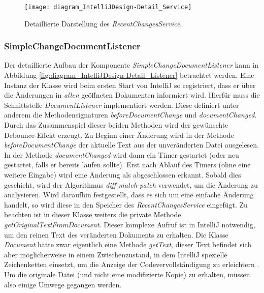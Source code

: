\begin{figure}
    \centering
    \texttt{[image: diagram\_IntelliJDesign-Detail\_Service]}
    \caption{Detaillierte Darstellung des \emph{RecentChangesService}.}
    \label{fig:diagram_IntelliJDesign-Detail_Service}
\end{figure}

\subsubsection{SimpleChangeDocumentListener}

Der detaillierte Aufbau der Komponente \emph{SimpleChangeDocumentListener}
kann in Abbildung \ref{fig:diagram_IntelliJDesign-Detail_Listener} betrachtet werden.
Eine Instanz der Klasse wird beim ersten Start von IntelliJ so registriert, 
dass er über die Änderungen in \emph{allen} geöffneten Dokumenten informiert wird. 
Hierfür muss die Schnittstelle \emph{DocumentListener} implementiert werden.
Diese definiert unter anderem die Methodensignaturen \emph{beforeDocumentChange}
und \emph{documentChanged}. Durch das Zusammenspiel dieser beiden Methoden
wird der gewünschte Debounce-Effekt erzeugt. Zu Beginn einer Änderung
wird in der Methode \emph{beforeDocumentChange} der aktuelle Text aus der 
unveränderten Datei ausgelesen. In der Methode \emph{documentChanged} wird
dann ein Timer gestartet (oder neu gestartet, falls er bereits laufen sollte).
Erst nach Ablauf des Timers (ohne eine weitere Eingabe) wird
eine Änderung als abgeschlossen erkannt. Sobald dies geschieht, wird 
der Algorithmus \emph{diff-match-patch} verwendet, um die Änderung zu analysieren.
Wird daraufhin festgestellt, dass es sich um eine einfache Änderung handelt,
so wird diese in den Speicher des \emph{RecentChangesService} eingefügt.
Zu beachten ist in dieser Klasse weiters die private Methode 
\emph{getOriginalTextFromDocument}. Dieser komplexe Aufruf %
ist in IntelliJ notwendig, um den reinen Text des veränderten Dokuments
zu erhalten. Die Klasse \emph{Document} hätte zwar eigentlich
eine Methode \emph{getText}, dieser Text befindet sich aber möglicherweise
in einem Zwischenzustand, in dem IntelliJ spezielle Zeichenketten 
einsetzt, um die Anzeige der Codevervollständigung zu erleichtern
\cite{IntelliJTheDreadedString,IntelliJGitHubCompletionUtilCore}.
Um die originale Datei (und nicht eine modifizierte Kopie) zu erhalten,
müssen also einige Umwege gegangen werden. %

